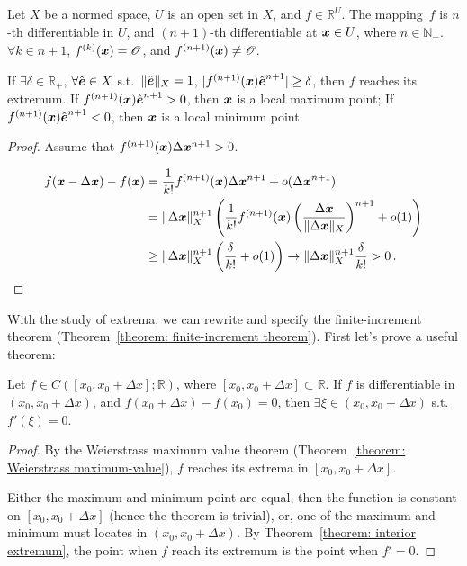 \documentclass[openany]{book}
\begin{document}
\begin{theorem}
	Let $X$ be a normed space, $U$ is an open set in $X$, and $f \in \mathbb R^U$.
	The mapping~$f$ is $n$-th differentiable in $U$, and $(n + 1)$-th differentiable at $\boldsymbol{x} \in U$, where $n \in \mathbb N_+$.
	$\forall k \in n + 1$, $f^{(k)}(\boldsymbol{x}) = \mathscr O$, and $f^{(n + 1)}(\boldsymbol{x}) \neq \mathscr O$.

	If $\exists \delta \in \mathbb R_+$, $\forall \hat{\boldsymbol{e}} \in X$ s.t.\ $\|\hat{\boldsymbol{e}}\|_X = 1$, $|f^{(n + 1)}(\boldsymbol{x}) \hat{\boldsymbol{e}}^{n+1}| \geq \delta$, then $f$ reaches its extremum.
	If $f^{(n + 1)}(\boldsymbol{x}) \hat{\boldsymbol{e}}^{n+1} > 0$, then $\boldsymbol{x}$ is a local maximum point; 
	If $f^{(n + 1)}(\boldsymbol{x}) \hat{\boldsymbol{e}}^{n+1} < 0$, then $\boldsymbol{x}$ is a local minimum point. 
\end{theorem}
\begin{proof}
	Assume that $f^{(n + 1)}(\boldsymbol{x}) \Delta \boldsymbol{x}^{n+1} > 0$.
	
	\begin{align*}
		f(\boldsymbol{x} - \Delta \boldsymbol{x}) - f(\boldsymbol{x})
		&= \frac{1}{k!} f^{(n + 1)}(\boldsymbol{x}) \Delta \boldsymbol{x}^{n+1} + o(\Delta \boldsymbol{x}^{n+1})
		\\
		&= \|\Delta \boldsymbol{x}\|_X^{n+1} \left( 
			\frac{1}{k!} f^{(n + 1)}(\boldsymbol{x}) \left(\frac{\Delta \boldsymbol{x}}{\|\Delta \boldsymbol{x}\|_X}\right)^{n+1} + o(1)
		 \right)
		\\
		&\geq
		\|\Delta \boldsymbol{x}\|_X^{n+1} \left( 
			\frac{\delta}{k!}  + o(1)
		 \right) \to \|\Delta \boldsymbol{x}\|_X^{n+1} \frac{\delta}{k!} > 0\,.
	\end{align*}	
\end{proof}

With the study of extrema, we can rewrite and specify the finite-increment theorem (Theorem~\ref{theorem: finite-increment theorem}). 
First let's prove a useful theorem:

\begin{theorem}
	\label{theorem: Rolle}
	Let $f \in C([x_0, x_0 + \Delta x]; \mathbb R)$, where $[x_0, x_0 + \Delta x] \subset \mathbb R$. 
	If $f$ is differentiable in $(x_0, x_0 + \Delta x)$, and $f(x_0 + \Delta x) - f(x_0) = 0$, then $\exists \xi \in (x_0, x_0 + \Delta x)$ s.t.\ $f'(\xi) = 0$.
\end{theorem}
\begin{proof}
	By the Weierstrass maximum value theorem (Theorem~\ref{theorem: Weierstrass maximum-value}), $f$ reaches its extrema in $[x_0, x_0 + \Delta x]$.
	
	Either the maximum and minimum point are equal, then the function is constant on $[x_0, x_0 + \Delta x]$ (hence the theorem is trivial), or, one of the maximum and minimum must locates in $(x_0, x_0 + \Delta x)$. 
	By Theorem~\ref{theorem: interior extremum}, the point when $f$ reach its extremum is the point when $f' = 0$.
\end{proof}
\end{document}
